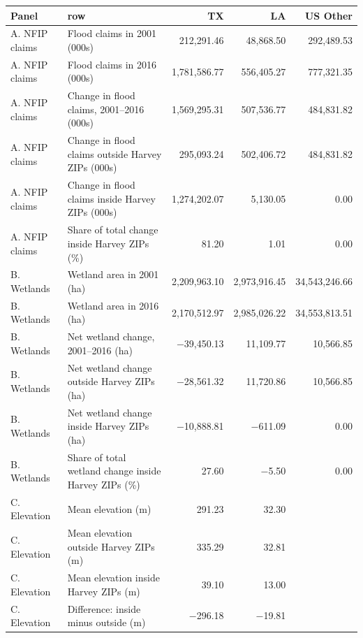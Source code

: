 \begin{tabular}{llrrr}
  \hline
Panel & row & TX & LA & US Other \\ 
  \hline
A. NFIP claims & Flood claims in 2001 (000s) & 212,291.46 & 48,868.50 & 292,489.53 \\ 
  A. NFIP claims & Flood claims in 2016 (000s) & 1,781,586.77 & 556,405.27 & 777,321.35 \\ 
  A. NFIP claims & Change in flood claims, 2001--2016 (000s) & 1,569,295.31 & 507,536.77 & 484,831.82 \\ 
  A. NFIP claims & Change in flood claims outside Harvey ZIPs (000s) & 295,093.24 & 502,406.72 & 484,831.82 \\ 
  A. NFIP claims & Change in flood claims inside Harvey ZIPs (000s) & 1,274,202.07 & 5,130.05 & 0.00 \\ 
  A. NFIP claims & Share of total change inside Harvey ZIPs (\%) & 81.20 & 1.01 & 0.00 \\ 
  B. Wetlands & Wetland area in 2001 (ha) & 2,209,963.10 & 2,973,916.45 & 34,543,246.66 \\ 
  B. Wetlands & Wetland area in 2016 (ha) & 2,170,512.97 & 2,985,026.22 & 34,553,813.51 \\ 
  B. Wetlands & Net wetland change, 2001--2016 (ha) & $-$39,450.13 & 11,109.77 & 10,566.85 \\ 
  B. Wetlands & Net wetland change outside Harvey ZIPs (ha) & $-$28,561.32 & 11,720.86 & 10,566.85 \\ 
  B. Wetlands & Net wetland change inside Harvey ZIPs (ha) & $-$10,888.81 & $-$611.09 & 0.00 \\ 
  B. Wetlands & Share of total wetland change inside Harvey ZIPs (\%) & 27.60 & $-$5.50 & 0.00 \\ 
  C. Elevation & Mean elevation (m) & 291.23 & 32.30 &  \\ 
  C. Elevation & Mean elevation outside Harvey ZIPs (m) & 335.29 & 32.81 &  \\ 
  C. Elevation & Mean elevation inside Harvey ZIPs (m) & 39.10 & 13.00 &  \\ 
  C. Elevation & Difference: inside minus outside (m) & $-$296.18 & $-$19.81 &  \\ 
   \hline
\end{tabular}

